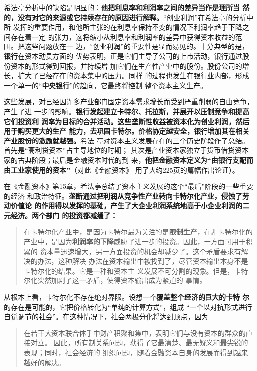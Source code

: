 希法亭分析中的缺陷是明显的：\textbf{他把利息率和利润率之间的差异当作是理所当
  然的，没有对它的来源或它持续存在的原因进行解释。}“创业利润”在希法亭的分析中所
发挥的重要作用，和他所主张的在利息率保持不变的情况下利润率趋于下降之间存在着一定
的张力，这将缩小从利息率和利润率的差异中获得资本收益的范围。把这些问题放在一
边，“创业利润”的重要性是显而易见的。十分典型的是，\textbf{银行}在资本动员方面的
优势表明，正是它们主导了公司的上市活动，银行通过股份资本的形式得到回报，并持续增
加它们在生产性产业中的股份。股份公司的增长，扩大了已经存在的资本集中的压力。同样
的过程也发生在银行业内部，形成一个单一的“\textbf{中央银行}”的趋向，它最终将控制
整个资本主义生产。

这些发展，对已经因许多产业部门固定资本需求增长而受到严重削弱的自由竞争，产生了进
一步的影响。\textbf{银行发起建立卡特尔、托拉斯，并展开以压制竞争和提高它们投资利
  润率为目标的合并活动。这些垄断性收益被资本化为创业利润，然后用于购买更大的生产
  能力，去巩固卡特尔。价格协定越安全，银行增加其在相关产业股份的激励就越强。}希法
亭对资本主义发展存在的三个历史阶段作了总结。首先是“高利贷资本”占主导地位的时期；
其次是产业资本家独立于货币借贷资本家的古典阶段；最后是金融资本时代的到
来，\textbf{他把金融资本定义为“由银行支配而由工业家使用的资本”}（对此《金融资本》
用了大约225页的篇幅作出论证）。

在《金融资本》第15章，希法亭总结了资本主义发展的这个“最后”阶段的一些重要的经济
和政治特征。\textbf{垄断通过把利润从竞争性产业转向卡特尔化产业，侵蚀了劳动价值论
  的作用得以发挥的基础，产生了大企业利润系统地高于小企业利润的二元经济。两个部门
  的投资都减缓了：}
\begin{quotation}
  在卡特尔化产业中，是因为卡特尔最为关注的是\textbf{限制生产}，在非卡特尔化的
  产业中，是因为\textbf{利润率的下降}威胁了进一步的投资。因此，一方面可用于积累的
  资本量迅速增大，另一方面投资的机会却减少了。这个矛盾要求有解决的办法，这种解决
  办法在资本输出中被找到了，尽管资本输出本身不是卡特尔化的结果。它是一种和资本主
  义发展不可分割的现象。但是，卡特尔化突然加剧了这一矛盾，使得资本输出成为紧迫的
  事情。
\end{quotation}

从根本上看，卡特尔化不存在绝对界限。设想一个\textbf{覆盖整个经济的巨大的卡特
  尔}的存在是可能的，它把价格转化为“单纯的计算方式”，组成 “一个以对抗形式进行
自觉调节的社会”。在这种情况下，社会两极分化将达到顶点，因为
\begin{quotation}
  在若干大资本联合体手中财产积聚和集中，表明它们与没有资本的群众的直接对立。
  因此，所有制关系问题，获得了它最清楚、最无疑义和最尖锐的表现；同时，社会经济的
  组织问题，随着金融资本自身的发展而得到越来越好的解决。
\end{quotation}

